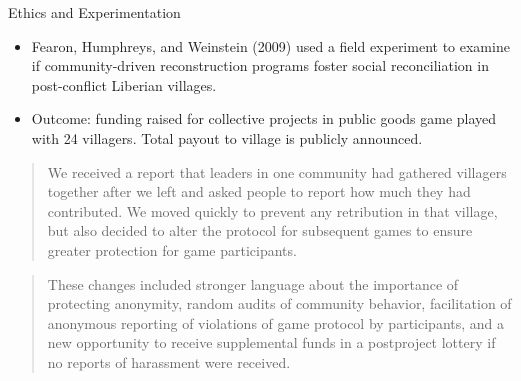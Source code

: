 \documentclass{beamer}
\numberwithin{equation}{section}
\begin{document}
\begin{frame}{Ethics and Experimentation}
\small
\begin{itemize}
\item Fearon, Humphreys, and Weinstein (2009) used a field experiment
  to examine if community-driven reconstruction programs foster
  social reconciliation in post-conflict Liberian villages.
  \item
    Outcome: funding raised for collective projects in public goods game
    played with 24 villagers. Total payout to village is publicly
    announced. \pause
\end{itemize}

\begin{quote}
We received a report that leaders in one community had gathered
villagers together after we left and asked people to report how much
they had contributed. We moved quickly to prevent any retribution in
that village, but also decided to alter the protocol for subsequent
games to ensure greater protection for game participants. \pause
\end{quote}
\vspace{-.1in}
\begin{quote}
These changes included stronger language about the importance of
protecting anonymity, random audits of community behavior, facilitation
of anonymous reporting of violations of game protocol by participants,
and a new opportunity to receive supplemental funds in a postproject
lottery if no reports of harassment were received.
\end{quote}

\end{frame}
\end{document}
